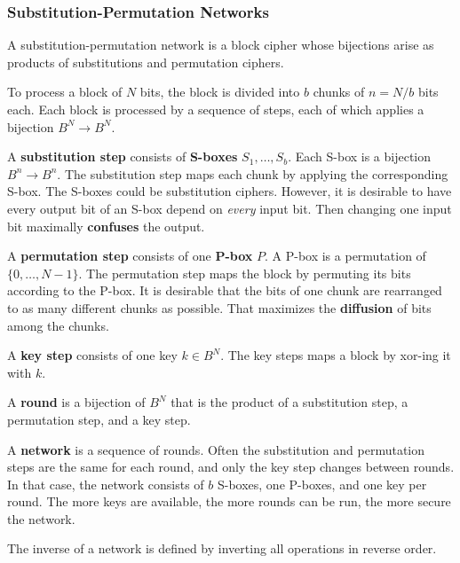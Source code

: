 \subsubsection{Substitution-Permutation Networks}

A substitution-permutation network is a block cipher whose bijections arise as products of substitutions and permutation ciphers.

To process a block of $N$ bits, the block is divided into $b$ chunks of $n=N/b$ bits each.
Each block is processed by a sequence of steps, each of which applies a bijection $B^N\to B^N$.

A \textbf{substitution step} consists of \textbf{S-boxes} $S_1,\ldots,S_b$.
Each S-box is a bijection $B^n\to B^n$.
The substitution step maps each chunk by applying the corresponding S-box.
The S-boxes could be substitution ciphers.
However, it is desirable to have every output bit of an S-box depend on \emph{every} input bit.
Then changing one input bit maximally \textbf{confuses} the output.

A \textbf{permutation step} consists of one \textbf{P-box} $P$.
A P-box is a permutation of $\{0,\ldots,N-1\}$.
The permutation step maps the block by permuting its bits according to the P-box.
It is desirable that the bits of one chunk are rearranged to as many different chunks as possible.
That maximizes the \textbf{diffusion} of bits among the chunks.

A \textbf{key step} consists of one key $k\in B^N$.
The key steps maps a block by xor-ing it with $k$.

A \textbf{round} is a bijection of $B^N$ that is the product of a substitution step, a permutation step, and a key step.

A \textbf{network} is a sequence of rounds.
Often the substitution and permutation steps are the same for each round, and only the key step changes between rounds.
In that case, the network consists of $b$ S-boxes, one P-boxes, and one key per round.
The more keys are available, the more rounds can be run, the more secure the network.

The inverse of a network is defined by inverting all operations in reverse order.


